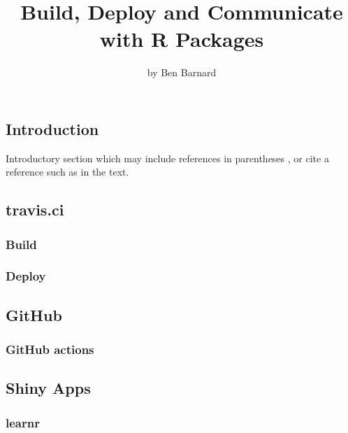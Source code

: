 \title{Build, Deploy and Communicate with R Packages}
\author{by Ben Barnard}

\maketitle


\hypertarget{introduction}{%
\subsection{Introduction}\label{introduction}}

Introductory section which may include references in parentheses
\citep{R}, or cite a reference such as \citet{R} in the text.

\hypertarget{travis.ci}{%
\subsection{travis.ci}\label{travis.ci}}

\hypertarget{build}{%
\subsubsection{Build}\label{build}}

\hypertarget{deploy}{%
\subsubsection{Deploy}\label{deploy}}

\hypertarget{github}{%
\subsection{GitHub}\label{github}}

\hypertarget{github-actions}{%
\subsubsection{GitHub actions}\label{github-actions}}

\hypertarget{shiny-apps}{%
\subsection{Shiny Apps}\label{shiny-apps}}

\hypertarget{learnr}{%
\subsubsection{learnr}\label{learnr}}


